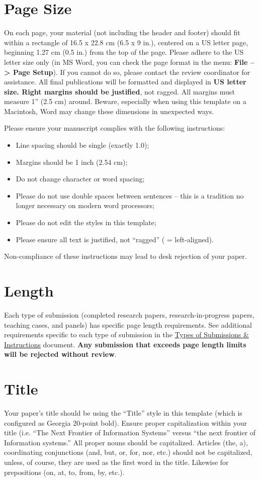 \documentclass{icis}
\begin{document}
\section{Page Size}
On each page, your material (not including the header and footer) should fit within a rectangle of 16.5 x 22.8 cm (6.5 x 9 in.), centered on a US letter page, beginning 1.27 cm (0.5 in.) from the top of the page.  Please adhere to the US letter size only (in MS Word, you can check the page format in the menu: \textbf{File --> Page Setup}). If you cannot do so, please contact the review coordinator for assistance. All final publications will be formatted and displayed in \textbf{US letter size. Right margins should be justified}, not ragged. All margins must measure 1” (2.5 cm) around. Beware, especially when using this template on a Macintosh, Word may change these dimensions in unexpected ways.

Please ensure your manuscript complies with the following instructions:
\begin{itemize}
    \item Line spacing should be single (exactly 1.0);
    \item Margins should be 1 inch (2.54 cm);
    \item Do not change character or word spacing;
    \item Please do not use double spaces between sentences – this is a tradition no longer necessary on modern word processors;
    \item Please do not edit the styles in this template;
    \item Please ensure all text is justified, not “ragged” ( = left-aligned).
\end{itemize}
Non-compliance of these instructions may lead to desk rejection of your paper.

\section{Length}
Each type of submission (completed research papers, research-in-progress papers,
teaching cases, and panels) has specific page length requirements. See
additional requirements specific to each type of submission in the \href{https://icis2022.aisconferences.org/submissions/types-of-submissions/}{Types of Submissions \& Instructions} document. \textbf{Any submission that
exceeds page length limits will be rejected without review}.

\section{Title}
Your paper’s title should be using the “Title” style in this template (which is configured as Georgia 20-point bold). Ensure proper capitalization within your title (i.e. “The Next Frontier of Information Systems” versus “the next frontier of Information systems.” 
All proper nouns should be capitalized. Articles (the, a), coordinating conjunctions (and, but, or, for, nor, etc.) should not be capitalized, unless, of course, they are used as the first word in the title. Likewise for prepositions (on, at, to, from, by, etc.).
\end{document}
